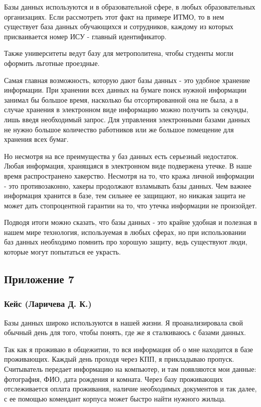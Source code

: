 \documentclass[a4paper,14pt]{extarticle}
\begin{document}
Базы данных используются и в образовательной сфере, в любых образовательных организациях. Если рассмотреть этот факт на примере ИТМО, то в нем существует база данных обучающихся и сотрудников, каждому из которых присваивается номер ИСУ - главный идентификатор.

Также университеты ведут базу для метрополитена, чтобы студенты могли оформить льготные проездные.

Самая главная возможность, которую дают базы данных - это удобное хранение информации. При хранении всех данных на бумаге поиск нужной информации занимал бы большое время, насколько бы отсортированной она не была, а в случае хранения в электронном виде информацию можно получить за секунды, лишь введя необходимый запрос. Для управления электронными базами данных не нужно большое количество работников или же большое помещение для хранения всех бумаг.

Но несмотря на все преимущества у баз данных есть серьезный недостаток. Любая информация, хранящаяся в электронном виде подвержена утечке. В наше время распространено хакерство. Несмотря на то, что кража личной информации - это противозаконно, хакеры продолжают взламывать базы данных. Чем важнее информация хранится в базе, тем сильнее ее защищают, но никакая защита не может дать стопроцентной гарантии на то, что утечка информации не произойдет.

Подводя итоги можно сказать, что базы данных - это крайне удобная и полезная в нашем мире технология, используемая в любых сферах, но при использовании баз данных необходимо помнить про хорошую защиту, ведь существуют люди, которые могут попытаться ее украсть.

\newpage

\subsection*{\hfill Приложение 7}

\subsubsection*{\centering Кейс (Ларичева Д. К.)}

Базы данных широко используются в нашей жизни. Я проанализировала свой обычный день для того, чтобы понять, где же я сталкиваюсь с базами данных.

Так как я проживаю в общежитии, то вся информация об о мне находится в базе проживающих. Каждый день проходя через КПП, я прикладываю пропуск. Считыватель передает информацию на компьютер, и там появляются мои данные: фотография, ФИО, дата рождения и комната. Через базу проживающих отслеживается оплата проживания, наличие необходимых документов и так далее, с ее помощью комендант корпуса может быстро найти нужного жильца.
\end{document}
